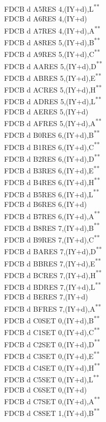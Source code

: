 \documentclass[twoside,openright,a4paper]{book}
\newcommand{\UNDOC}{\textnormal{\textsuperscript{**}}}
\begin{document}
\begin{multicols}{3}
{\begin{tabbing}
	FDCB d A5\>RES 4,(IY+d),L\UNDOC\\
	FDCB d A6\>RES 4,(IY+d)\\
	FDCB d A7\>RES 4,(IY+d),A\UNDOC\\
	FDCB d A8\>RES 5,(IY+d),B\UNDOC\\
	FDCB d A9\>RES 5,(IY+d),C\UNDOC\\
	FDCB d AA\>RES 5,(IY+d),D\UNDOC\\
	FDCB d AB\>RES 5,(IY+d),E\UNDOC\\
	FDCB d AC\>RES 5,(IY+d),H\UNDOC\\
	FDCB d AD\>RES 5,(IY+d),L\UNDOC\\
	FDCB d AE\>RES 5,(IY+d)\\
	FDCB d AF\>RES 5,(IY+d),A\UNDOC\\
	FDCB d B0\>RES 6,(IY+d),B\UNDOC\\
	FDCB d B1\>RES 6,(IY+d),C\UNDOC\\
	FDCB d B2\>RES 6,(IY+d),D\UNDOC\\
	FDCB d B3\>RES 6,(IY+d),E\UNDOC\\
	FDCB d B4\>RES 6,(IY+d),H\UNDOC\\
	FDCB d B5\>RES 6,(IY+d),L\UNDOC\\
	FDCB d B6\>RES 6,(IY+d)\\
	FDCB d B7\>RES 6,(IY+d),A\UNDOC\\
	FDCB d B8\>RES 7,(IY+d),B\UNDOC\\
	FDCB d B9\>RES 7,(IY+d),C\UNDOC\\
	FDCB d BA\>RES 7,(IY+d),D\UNDOC\\
	FDCB d BB\>RES 7,(IY+d),E\UNDOC\\
	FDCB d BC\>RES 7,(IY+d),H\UNDOC\\
	FDCB d BD\>RES 7,(IY+d),L\UNDOC\\
	FDCB d BE\>RES 7,(IY+d)\\
	FDCB d BF\>RES 7,(IY+d),A\UNDOC\\
	FDCB d C0\>SET 0,(IY+d),B\UNDOC\\
	FDCB d C1\>SET 0,(IY+d),C\UNDOC\\
	FDCB d C2\>SET 0,(IY+d),D\UNDOC\\
	FDCB d C3\>SET 0,(IY+d),E\UNDOC\\
	FDCB d C4\>SET 0,(IY+d),H\UNDOC\\
	FDCB d C5\>SET 0,(IY+d),L\UNDOC\\
	FDCB d C6\>SET 0,(IY+d)\\
	FDCB d C7\>SET 0,(IY+d),A\UNDOC\\
	FDCB d C8\>SET 1,(IY+d),B\UNDOC\\

\end{tabbing}}
\end{multicols}
\end{document}

